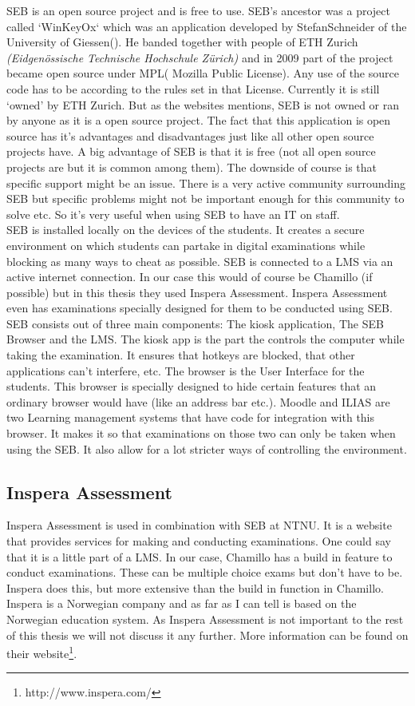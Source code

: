 SEB is an open source project and is free to use. SEB's ancestor was a project called `WinKeyOx` which was an application developed by StefanSchneider of the University of Giessen(\textcite{SEBfaq}). He banded together with people of ETH Zurich \textit{(Eidgenössische Technische Hochschule Zürich)} and in 2009 part of the project became open source under MPL( Mozilla Public License). Any use of the source code has to be according to the rules set in that License. Currently it is still `owned' by ETH Zurich. But as the websites mentions, SEB is not owned or ran by anyone as it is a open source project.
The fact that this application is open source has it's advantages and disadvantages just like all other open source projects have. A big advantage of SEB is that it is free (not all open source projects are but it is common among them). The downside of course is that specific support might be an issue. There is a very active community surrounding SEB but specific problems might not be important enough for this community to solve etc. So it's very useful when using SEB to have an IT on staff.\\

SEB is installed locally on the devices of the students. It creates a secure environment on which students can partake in digital examinations while blocking as many ways to cheat as possible. SEB is connected to a LMS via an active internet connection. In our case this would of course be Chamillo (if possible) but in this thesis they used Inspera Assessment. Inspera Assessment even has examinations specially designed for them to be conducted using SEB.
SEB consists out of three main components: The kiosk application, The SEB Browser and the LMS. The kiosk app is the part the controls the computer while taking the examination. It ensures that hotkeys are blocked, that other applications can't interfere, etc. 
The browser is the User Interface for the students. This browser is specially designed to hide certain features that an ordinary browser would have (like an address bar etc.). Moodle and ILIAS are two Learning management systems that have code for integration with this browser. It makes it so that examinations on those two can only be taken when using the SEB. It also allow for a lot stricter ways of controlling the environment. \\

\subsection{Inspera Assessment}
Inspera Assessment is used in combination with SEB at NTNU. It is a website that provides services for making and conducting examinations. One could say that it is a little part of a LMS. In our case, Chamillo has a build in feature to conduct examinations. These can be multiple choice exams but don't have to be.  Inspera does this, but more extensive than the build in function in Chamillo. Inspera is a Norwegian company and as far as I can tell is based on the Norwegian education system. As Inspera Assessment is not important to the rest of this thesis we will not discuss it any further. More information can be found on their website\footnote{http://www.inspera.com/}.

